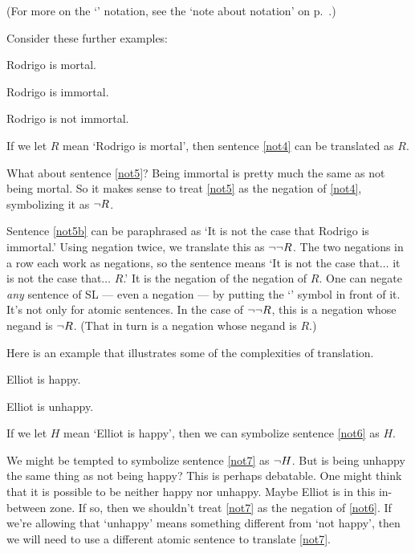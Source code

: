 
(For more on the `\metaA{}' notation, see the `note about notation' on p.\ \pageref{notationnote}.)

Consider these further examples:
\begin{earg}
\item[\ex{not4}] Rodrigo is mortal.
\item[\ex{not5}] Rodrigo is immortal.
\item[\ex{not5b}] Rodrigo is not immortal.
\end{earg}

If we let $R$ mean `Rodrigo is mortal', then sentence \ref{not4} can be translated as $R$.

What about sentence \ref{not5}? Being immortal is pretty much the same as not being mortal. So it makes sense to treat \ref{not5} as the negation of \ref{not4}, symbolizing it as $\neg{R}$.

Sentence \ref{not5b} can be paraphrased as `It is not the case that Rodrigo is immortal.' Using negation twice, we translate this as $\neg\neg R$. The two negations in a row each work as negations, so the sentence means `It is not the case that$\ldots$ it is not the case that$\ldots$ $R$.' It is the negation of the negation of $R$. One can negate \emph{any} sentence of SL --- even a negation --- by putting the `\enot{}' symbol in front of it. It's not only for atomic sentences. In the case of $\neg\neg R$, this is a negation whose negand is $\neg R$. (That in turn is a negation whose negand is $R$.)

Here is an example that illustrates some of the complexities of translation.
\begin{earg}
\item[\ex{not6}] Elliot is happy.
\item[\ex{not7}] Elliot is unhappy.
\end{earg}

If we let $H$ mean `Elliot is happy', then we can symbolize sentence \ref{not6} as $H$.

We might be tempted to symbolize sentence \ref{not7} as $\neg{H}$. But is being unhappy the same thing as not being happy? This is perhaps debatable. One might think that it is possible to be neither happy nor unhappy. Maybe Elliot is in this in-between zone. If so, then we shouldn't treat \ref{not7} as the negation of \ref{not6}. If we're allowing that `unhappy' means something different from `not happy', then we will need to use a different atomic sentence to translate \ref{not7}.

